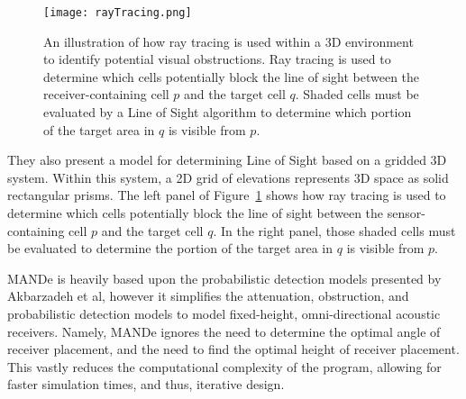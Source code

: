 \begin{figure}[ht]
	\centering
	\texttt{[image: rayTracing.png]}
	\caption{An illustration of how ray tracing is used within a 3D environment to identify potential visual obstructions.  Ray tracing is used to determine which cells potentially block the line of sight between the receiver-containing cell $p$ and the target cell $q$.  Shaded cells must be evaluated by a Line of Sight algorithm to determine which portion of the target area in $q$ is visible from $p$. \cite{Akbarzadeh2013}\label{rayTracingImg1}}
\end{figure}

They also present a model for determining Line of Sight based on a gridded 3D system.  Within this system, a 2D grid of elevations represents 3D space as solid rectangular prisms.  The left panel of Figure~\ref{rayTracingImg1} shows how ray tracing is used to determine which cells potentially block the line of sight between the sensor-containing cell $p$ and the target cell $q$.  In the right panel, those shaded cells must be evaluated to determine the portion of the target area in $q$ is visible from $p$.

MANDe is heavily based upon the probabilistic detection models presented by Akbarzadeh et al, however it simplifies the attenuation, obstruction, and probabilistic detection models to model fixed-height, omni-directional acoustic receivers.  Namely, MANDe ignores the need to determine the optimal angle of receiver placement, and the need to find the optimal height of receiver placement.  This vastly reduces the computational complexity of the program, allowing for faster simulation times, and thus, iterative design.


